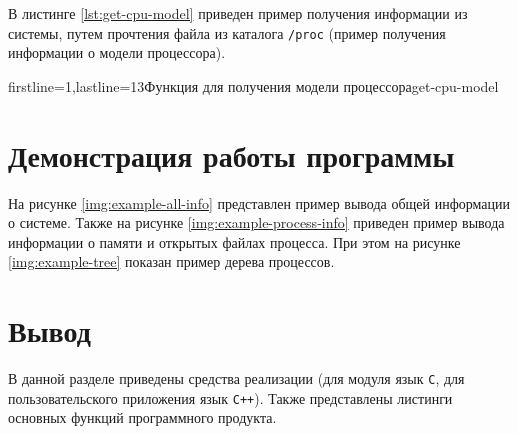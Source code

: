 В листинге \ref{lst:get-cpu-model} приведен пример получения информации из системы, путем прочтения файла из каталога \texttt{/proc} (пример получения информации о модели процессора).

    {firstline=1,lastline=13}{Функция для получения модели процессора}{get-cpu-model}{}


\section{Демонстрация работы программы}

На рисунке \ref{img:example-all-info} представлен пример вывода общей информации о системе. Также на рисунке \ref{img:example-process-info} приведен пример вывода информации о памяти и открытых файлах процесса. При этом на рисунке \ref{img:example-tree} показан пример дерева процессов.



\section*{Вывод}

В данной разделе приведены средства реализации (для модуля язык \texttt{C}, для пользовательского приложения язык \texttt{C++}). Также представлены листинги основных функций программного продукта.
